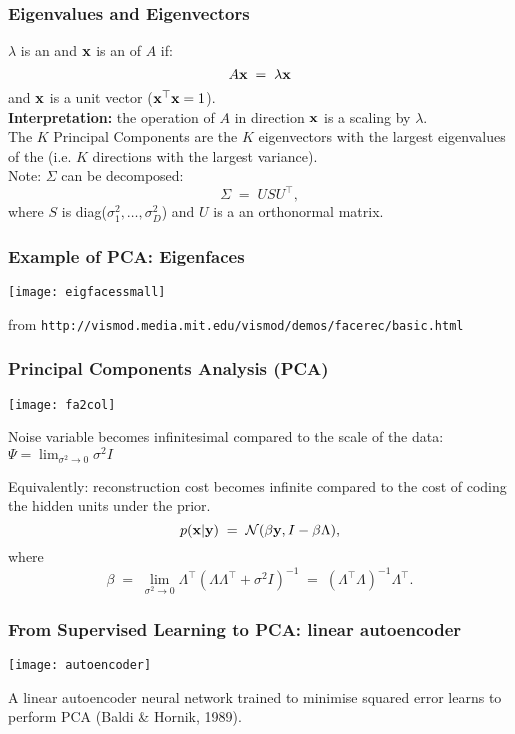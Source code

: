 \begin{frame}
\frametitle{Eigenvalues and Eigenvectors}

$\lambda$ is an  and $\mathbf x$ is an  of $A$ if:
%
\[
A \mathbf x\;=\;\lambda \mathbf x
\]
and $\mathbf x$ is a unit vector ($\mathbf x^\top \mathbf x = 1$). \\[1ex]

{\bf Interpretation:} the operation of $A$ in direction $\mathbf x$ is a scaling
by $\lambda$. \\[1ex]

The $K$ Principal Components are the $K$ eigenvectors with the largest
eigenvalues of the  (i.e. $K$ directions with
the largest variance). \\[1ex]

Note: $\Sigma$ can be decomposed:
\[
\Sigma\;=\; U S U^\top,
\]
where $S$ is diag($\sigma^2_1, \ldots, \sigma^2_D$) and $U$ is a
an orthonormal matrix.
\end{frame}

\begin{frame}
\frametitle{Example of PCA: Eigenfaces}

\centerline{\texttt{[image: eigfacessmall]}}

from \texttt{http://vismod.media.mit.edu/vismod/demos/facerec/basic.html}
\end{frame}

\begin{frame}
\frametitle{Principal Components Analysis (PCA)}
\vskip 3mm

\centerline{\texttt{[image: fa2col]}}

Noise variable becomes infinitesimal compared to the scale of the
data: $\displaystyle \Psi = \lim_{\sigma^2 \rightarrow 0} \sigma^2 I $

Equivalently: reconstruction cost becomes infinite compared to the
cost of coding the hidden units under the prior.
\[
p(\mathbf x|\mathbf y)\;=\;{\cal N}(\beta \mathbf y, I - \beta \Lambda),
\]
where
\[
\beta\;=\;\lim_{\sigma^2 \rightarrow 0} \Lambda^\top (\Lambda \Lambda^\top +
\sigma^2 I)^{-1}\;=\;(\Lambda^\top \Lambda)^{-1} \Lambda^\top.
\]
\end{frame}

\begin{frame}
\frametitle{From Supervised Learning to PCA: linear autoencoder}

\vspace{4mm}
\centerline{\texttt{[image: autoencoder]}}

\vspace{4mm}
A linear autoencoder neural network trained to minimise squared error
learns to perform PCA (Baldi \& Hornik, 1989).
\end{frame}

